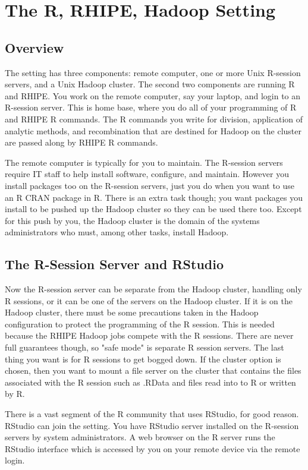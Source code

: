\section{The R, RHIPE, Hadoop Setting}
\subsection{Overview}
The setting has three components: remote computer, one or more Unix
R-session servers, and a Unix Hadoop cluster. The second two components are
running R and RHIPE.  You work on the remote
computer, say your laptop, and login to an R-session server.
This is home base, where you do all of your programming
of R and RHIPE R commands. The R commands you write for division, application
of analytic methods, and recombination that are destined for Hadoop on the
cluster are passed along by RHIPE R commands.

The remote computer is typically for you to maintain. The R-session
servers  require IT staff to help install software, configure, and maintain.
However you install packages too on the R-session servers, just you do when you
want to use an R CRAN package in R. There is an extra task though; you want
packages you install to be pushed up the Hadoop cluster so they can be used
there too.  Except for this push by you, the Hadoop cluster is the
domain of the systems administrators who must, among other tasks, install
Hadoop.

\subsection{The R-Session Server and RStudio}

Now the R-session server can be separate from the Hadoop cluster, handling
only R sessions, or it can be one of the servers on the Hadoop cluster. If it
is on the Hadoop cluster, there must be some precautions taken in the Hadoop
configuration to protect the programming of the R session. This is needed
because the RHIPE Hadoop jobs compete with the R sessions. There are never full
guarantees though, so "safe mode" is separate R session servers. The last thing
you want is for R sessions to get bogged down. If the cluster option is chosen,
then you want to mount a file server on the cluster that contains the files
associated with the R session such as .RData and files read into to R or
written by R.

There is a vast segment of the R community that uses RStudio, for good reason.
RStudio can join the setting. You have RStudio server  installed on the
R-session servers by system administrators. A web browser on the R server runs
the RStudio interface which is accessed by you on your remote device via the
remote login.

